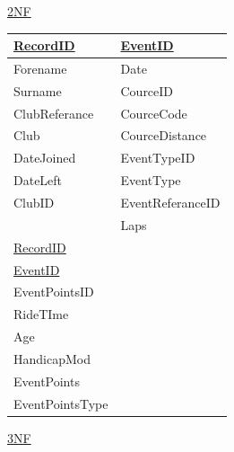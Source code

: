 \underline{2NF}

\begin{tabular}{|l|l|}
\hline
\underline{RecordID} & \underline{EventID} \\ \hline
Forename             & Date                \\ \hline
Surname              & CourceID            \\ \hline
ClubReferance        & CourceCode          \\ \hline
Club                 & CourceDistance      \\ \hline
DateJoined           & EventTypeID         \\ \hline
DateLeft             & EventType           \\ \hline
ClubID               & EventReferanceID    \\ \hline
                     & Laps                \\ \hline
\underline{RecordID} &                     \\ \hline
\underline{EventID}  &                     \\ \hline 
EventPointsID        &                     \\ \hline
RideTIme             &                     \\ \hline
Age                  &                     \\ \hline
HandicapMod          &                     \\ \hline
EventPoints          &                     \\ \hline
EventPointsType      &                     \\ \hline
\end{tabular}

\underline{3NF}

